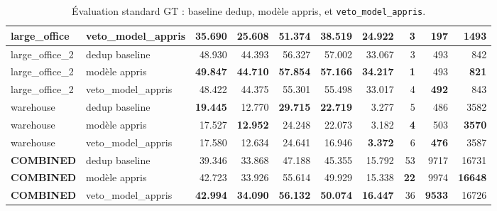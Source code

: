 \documentclass[11pt,a4paper]{article}
\begin{document}
\begin{table}[H]
{\begin{tabular}{l l r r r r r r r r}
large\_office & veto\_model\_appris & 35.690 & 25.608 & 51.374 & 38.519 & 24.922 & 3 & \textbf{197} & 1493 \\
\midrule
large\_office\_2 & dedup baseline & 48.930 & 44.393 & 56.327 & 57.002 & 33.067 & 3 & 493 & 842 \\
large\_office\_2 & modèle appris & \textbf{49.847} & \textbf{44.710} & \textbf{57.854} & \textbf{57.166} & \textbf{34.217} & \textbf{1} & 493 & \textbf{821} \\
large\_office\_2 & veto\_model\_appris & 48.422 & 44.375 & 55.301 & 55.498 & 33.017 & 4 & \textbf{492} & 843 \\
\midrule
warehouse & dedup baseline & \textbf{19.445} & 12.770 & \textbf{29.715} & \textbf{22.719} & 3.277 & 5 & 486 & 3582 \\
warehouse & modèle appris & 17.527 & \textbf{12.952} & 24.248 & 22.073 & 3.182 & \textbf{4} & 503 & \textbf{3570} \\
warehouse & veto\_model\_appris & 17.580 & 12.634 & 24.641 & 16.946 & \textbf{3.372} & 6 & \textbf{476} & 3587 \\
\midrule
\textbf{COMBINED} & dedup baseline & 39.346 & 33.868 & 47.188 & 45.355 & 15.792 & 53 & 9717 & 16731 \\
\textbf{COMBINED} & modèle appris & 42.723 & 33.926 & 55.614 & 49.929 & 15.338 & \textbf{22} & 9974 & \textbf{16648} \\
\textbf{COMBINED} & veto\_model\_appris & \textbf{42.994} & \textbf{34.090} & \textbf{56.132} & \textbf{50.074} & \textbf{16.447} & 36 & \textbf{9533} & 16726 \\
\bottomrule
\end{tabular}
}
\caption{Évaluation standard GT : baseline dedup, modèle appris, et \texttt{veto\_model\_appris}.}
\end{table}

\begin{table}[H]
\centering
{}
\caption{Deltas COMBINED sur standard GT. Les deltas positifs indiquent une hausse de la métrique ; pour IDSW, une valeur négative est meilleure.}
\end{table}
\end{document}
